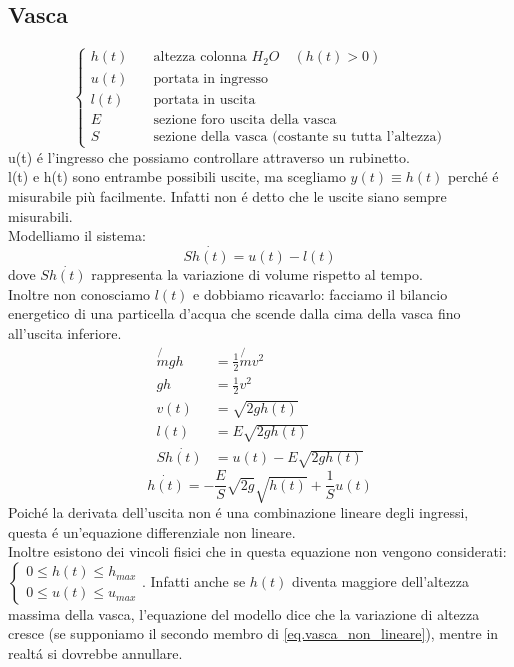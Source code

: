 \documentclass[../main.tex]{subfiles}
\begin{document}
	\subsection{Vasca}
	\[
		\begin{cases}
			h(t) & \quad \text{altezza colonna $H_{2}O$} \quad (h(t)>0)\\
			u(t) & \quad \text{portata in ingresso}\\
			l(t) & \quad \text{portata in uscita}\\
			E & \quad \text{sezione foro uscita della vasca}\\
			S & \quad \text{sezione della vasca (costante su tutta l'altezza)}
		\end{cases}
	\]
	u(t) \'e l'ingresso che possiamo controllare attraverso un rubinetto.\\
	l(t) e h(t) sono entrambe possibili uscite, ma scegliamo $y(t) \equiv h(t)$ perché \'e misurabile più facilmente. Infatti non \'e detto che le uscite siano sempre misurabili.\\
	Modelliamo il sistema:
	\begin{equation}
		S \dot{h(t)} = u(t) - l(t)
	\end{equation}
	dove $S \dot{h(t)}$ rappresenta la variazione di volume rispetto al tempo.\\
	Inoltre non conosciamo $l(t)$ e dobbiamo ricavarlo: facciamo il bilancio energetico di una particella d'acqua che scende dalla cima della vasca fino all'uscita inferiore.
	\begin{align*}
		\not{m} gh &= \frac{1}{2} \not{m} v^2\\
		gh &= \frac{1}{2} v^2\\
		v(t) &= \sqrt{2gh(t)}\\
		l(t) &= E \sqrt{2gh(t)}\\
		S \dot{h(t)} &= u(t) - E \sqrt{2gh(t)}
	\end{align*}
	\begin{equation} \label{eq.vasca_non_lineare}
		\dot{h(t)} = - \frac{E}{S} \sqrt{2g} \sqrt{h(t)} + \frac{1}{S} u(t)
	\end{equation}
	Poiché la derivata dell'uscita non \'e una combinazione lineare degli ingressi, questa \'e un'equazione differenziale non lineare.\\
	Inoltre esistono dei vincoli fisici che in questa equazione non vengono considerati: 
	\(
		\begin{cases}
			0 \leq h(t) \leq h_{max}\\
			0 \leq u(t) \leq u_{max}
		\end{cases}
	\).
	Infatti anche se $h(t)$ diventa maggiore dell'altezza massima della vasca, l'equazione del modello dice che la variazione di altezza cresce (se supponiamo il secondo membro di \ref{eq.vasca_non_lineare}), mentre in realt\'a si dovrebbe annullare.
\end{document}
